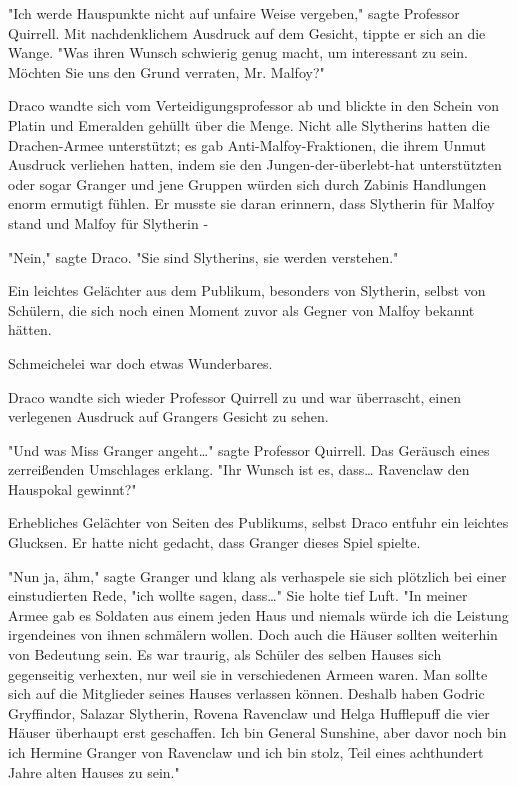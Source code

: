{"Ich werde Hauspunkte nicht auf unfaire Weise vergeben," sagte Professor Quirrell. Mit nachdenklichem Ausdruck auf dem Gesicht, tippte er sich an die Wange. "Was ihren Wunsch schwierig genug macht, um interessant zu sein. Möchten Sie uns den Grund verraten, Mr. Malfoy?"

Draco wandte sich vom Verteidigungsprofessor ab und blickte in den Schein von Platin und Emeralden gehüllt über die Menge. Nicht alle Slytherins hatten die Drachen-Armee unterstützt; es gab Anti-Malfoy-Fraktionen, die ihrem Unmut Ausdruck verliehen hatten, indem sie den Jungen-der-überlebt-hat unterstützten oder sogar Granger und jene Gruppen würden sich durch Zabinis Handlungen enorm ermutigt fühlen. Er musste sie daran erinnern, dass Slytherin für Malfoy stand und Malfoy für Slytherin -

"Nein," sagte Draco. "Sie sind Slytherins, sie werden verstehen."

Ein leichtes Gelächter aus dem Publikum, besonders von Slytherin, selbst von Schülern, die sich noch einen Moment zuvor als Gegner von Malfoy bekannt hätten.

Schmeichelei war doch etwas Wunderbares.

Draco wandte sich wieder Professor Quirrell zu und war überrascht, einen verlegenen Ausdruck auf Grangers Gesicht zu sehen.

"Und was Miss Granger angeht…" sagte Professor Quirrell. Das Geräusch eines zerreißenden Umschlages erklang. "Ihr Wunsch ist es, dass… Ravenclaw den Hauspokal gewinnt?"

Erhebliches Gelächter von Seiten des Publikums, selbst Draco entfuhr ein leichtes Glucksen. Er hatte nicht gedacht, dass Granger dieses Spiel spielte.

"Nun ja, ähm," sagte Granger und klang als verhaspele sie sich plötzlich bei einer einstudierten Rede, "ich wollte sagen, dass…" Sie holte tief Luft. "In meiner Armee gab es Soldaten aus einem jeden Haus und niemals würde ich die Leistung irgendeines von ihnen schmälern wollen. Doch auch die Häuser sollten weiterhin von Bedeutung sein. Es war traurig, als Schüler des selben Hauses sich gegenseitig verhexten, nur weil sie in verschiedenen Armeen waren. Man sollte sich auf die Mitglieder seines Hauses verlassen können. Deshalb haben Godric Gryffindor, Salazar Slytherin, Rovena Ravenclaw und Helga Hufflepuff die vier Häuser überhaupt erst geschaffen. Ich bin General Sunshine, aber davor noch bin ich Hermine Granger von Ravenclaw und ich bin stolz, Teil eines achthundert Jahre alten Hauses zu sein."

}
